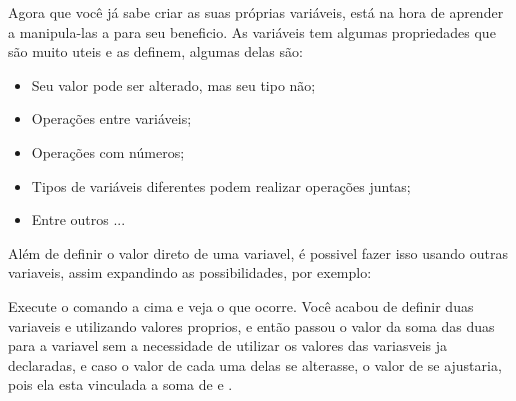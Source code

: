  Agora que você já sabe criar as suas próprias variáveis, está na hora de aprender a manipula-las a para seu beneficio. As variáveis tem algumas propriedades que são muito uteis e as definem, algumas delas são:


\begin{itemize}
	\item Seu valor pode ser alterado, mas seu tipo não;
	\item Operações entre variáveis;
	\item Operações com números;
	\item Tipos de variáveis diferentes podem realizar operações juntas;
	\item Entre outros ...
\end{itemize}

Além de definir o valor direto de uma variavel, é possivel fazer isso usando outras variaveis, assim expandindo as possibilidades, por exemplo:


Execute o comando a cima e veja o que ocorre. Você acabou de definir duas variaveis  e  utilizando valores proprios, e então passou o valor da soma das duas para a variavel  sem a necessidade de utilizar os valores das variasveis ja declaradas, e caso o valor de cada uma delas se alterasse, o valor de  se ajustaria, pois ela esta vinculada a soma de  e .